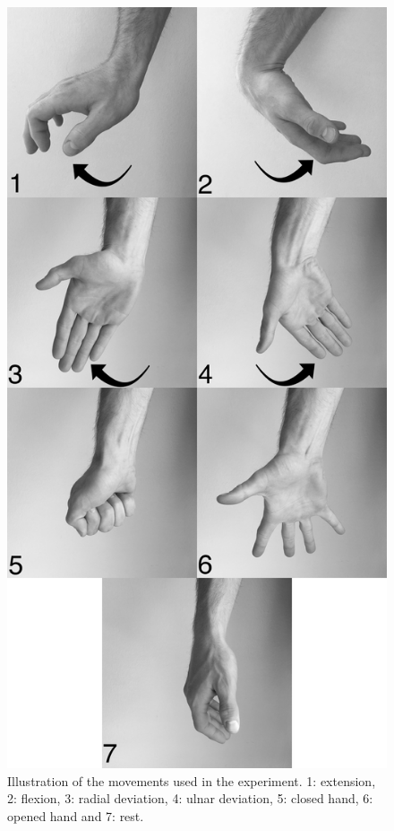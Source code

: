 \begin{figure}[H]                 
	\includegraphics[width=.6\textwidth]{figures/handGestures/BW/allHandMovementsVerticalBW}  
	\caption{Illustration of the movements used in the experiment. 1: extension, 2: flexion, 3: radial deviation, 4: ulnar deviation, 5: closed hand, 6: opened hand and 7: rest.}
	\label{fig:experiment_movements} 
\end{figure}

